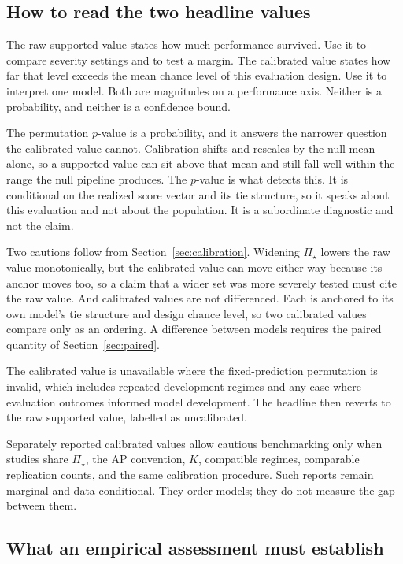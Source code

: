 \documentclass[11pt]{article}
\newcommand{\PSet}{\Pi_\star}
\theoremstyle{remark}
\begin{document}
\subsection{How to read the two headline values}

The raw supported value states how much performance survived. Use it to compare severity settings and to test a margin. The calibrated value states how far that level exceeds the mean chance level of this evaluation design. Use it to interpret one model. Both are magnitudes on a performance axis. Neither is a probability, and neither is a confidence bound.

The permutation $p$-value is a probability, and it answers the narrower question the calibrated value cannot. Calibration shifts and rescales by the null mean alone, so a supported value can sit above that mean and still fall well within the range the null pipeline produces. The $p$-value is what detects this. It is conditional on the realized score vector and its tie structure, so it speaks about this evaluation and not about the population. It is a subordinate diagnostic and not the claim.

Two cautions follow from Section~\ref{sec:calibration}. Widening $\PSet$ lowers the raw value monotonically, but the calibrated value can move either way because its anchor moves too, so a claim that a wider set was more severely tested must cite the raw value. And calibrated values are not differenced. Each is anchored to its own model's tie structure and design chance level, so two calibrated values compare only as an ordering. A difference between models requires the paired quantity of Section~\ref{sec:paired}.

The calibrated value is unavailable where the fixed-prediction permutation is invalid, which includes repeated-development regimes and any case where evaluation outcomes informed model development. The headline then reverts to the raw supported value, labelled as uncalibrated.

Separately reported calibrated values allow cautious benchmarking only when studies share $\PSet$, the AP convention, $K$, compatible regimes, comparable replication counts, and the same calibration procedure. Such reports remain marginal and data-conditional. They order models; they do not measure the gap between them.

\subsection{What an empirical assessment must establish}
\end{document}
